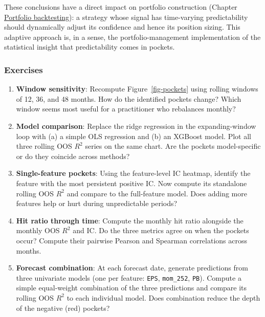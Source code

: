 These conclusions have a direct impact on portfolio construction (Chapter \href{/chap-15-portfolio-backtesting}{Portfolio backtesting}): a strategy whose signal has time-varying predictability should dynamically adjust its confidence and hence its position sizing. This adaptive approach is, in a sense, the portfolio-management implementation of the statistical insight that predictability comes in pockets.

\subsubsection{Exercises}

\begin{enumerate}
\item \textbf{Window sensitivity}: Recompute Figure~\ref{fig-pockets} using rolling windows of 12, 36, and 48 months. How do the identified pockets change? Which window seems most useful for a practitioner who rebalances monthly?
\item \textbf{Model comparison}: Replace the ridge regression in the expanding-window loop with (a) a simple OLS regression and (b) an XGBoost model. Plot all three rolling OOS $R^2$ series on the same chart. Are the pockets model-specific or do they coincide across methods?
\item \textbf{Single-feature pockets}: Using the feature-level IC heatmap, identify the feature with the most persistent positive IC. Now compute its standalone rolling OOS $R^2$ and compare to the full-feature model. Does adding more features help or hurt during unpredictable periods?
\item \textbf{Hit ratio through time}: Compute the monthly hit ratio alongside the monthly OOS $R^2$ and IC. Do the three metrics agree on when the pockets occur? Compute their pairwise Pearson and Spearman correlations across months.
\item \textbf{Forecast combination}: At each forecast date, generate predictions from three univariate models (one per feature: \texttt{EPS}, \texttt{mom\_252}, \texttt{PB}). Compute a simple equal-weight combination of the three predictions and compare its rolling OOS $R^2$ to each individual model. Does combination reduce the depth of the negative (red) pockets?
\end{enumerate}